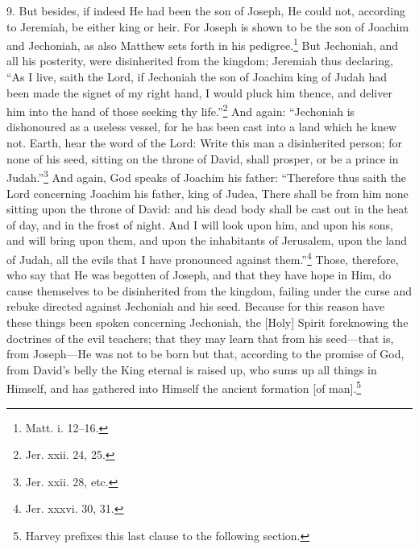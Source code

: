 9. But besides, if indeed He had been the son of Joseph, He could not, according to Jeremiah, be either king or heir. For Joseph is shown to be the son of Joachim and Jechoniah, as also Matthew sets forth in his pedigree.\footnote{Matt. i. 12–16.} But Jechoniah, and all his posterity, were disinherited from the kingdom; Jeremiah thus declaring, “As I live, saith the Lord, if Jechoniah the son of Joachim king of Judah had been made the signet of my right hand, I would pluck him thence, and deliver him into the hand of those seeking thy life.”\footnote{Jer. xxii. 24, 25.} And again: “Jechoniah is dishonoured as a useless vessel, for he has been cast into a land which he knew not. Earth, hear the word of the Lord: Write this man a disinherited person; for none of his seed, sitting on the throne of David, shall prosper, or be a prince in Judah.”\footnote{Jer. xxii. 28, etc.} And again, God speaks of Joachim his father: “Therefore thus saith the Lord concerning Joachim his father, king of Judea, There shall be from him none sitting upon the throne of David: and his dead body shall be cast out in the heat of day, and in the frost of night. And I will look upon him, and upon  his sons, and will bring upon them, and upon the inhabitants of Jerusalem, upon the land of Judah, all the evils that I have pronounced against them.”\footnote{Jer. xxxvi. 30, 31.} Those, therefore, who say that He was begotten of Joseph, and that they have hope in Him, do cause themselves to be disinherited from the kingdom, failing under the curse and rebuke directed against Jechoniah and his seed. Because for this reason have these things been spoken concerning Jechoniah, the [Holy] Spirit foreknowing the doctrines of the evil teachers; that they may learn that from his seed—that is, from Joseph—He was not to be born but that, according to the promise of God, from David’s belly the King eternal is raised up, who sums up all things in Himself, and has gathered into Himself the ancient formation [of man].\footnote{Harvey prefixes this last clause to the following section.}

